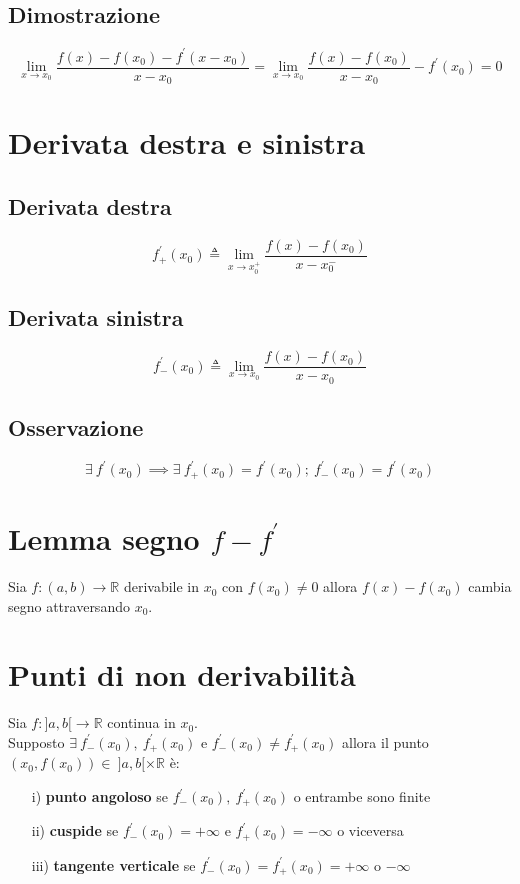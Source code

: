 \subsection{Dimostrazione}
\begin{equation}
\displaystyle \lim_{x \to x_0} \frac{f(x) - f(x_0) - f^{\prime}(x - x_0)}{x - x_0} = \lim_{x \to x_0} \frac{f(x) - f(x_0)}{x - x_0} - f^{\prime}(x_0) = 0
\end{equation}

\section{Derivata destra e sinistra}
\subsection{Derivata destra}
\begin{equation}
f^{\prime}_+(x_0) \triangleq \displaystyle \lim_{x \to x_0^+} \frac{f(x) - f(x_0)}{x - x_0^-}
\end{equation}
\subsection{Derivata sinistra}
\begin{equation}
f^{\prime}_-(x_0) \triangleq \displaystyle \lim_{x \to x_0} \frac{f(x) - f(x_0)}{x - x_0}
\end{equation}
\subsection{Osservazione}
\begin{equation}
\exists\ f^{\prime}(x_0) \implies \exists\ f^{\prime}_+(x_0) = f^{\prime}(x_0);\ f^{\prime}_-(x_0) = f^{\prime}(x_0)
\end{equation}

\section{Lemma segno $f - f^{\prime}$}
Sia $f: (a,b)  \to \mathbb{R}$ derivabile in $x_0$ con $f(x_0) \neq 0$ allora $f(x) - f(x_0)$ cambia segno attraversando $x_0$.

\section{Punti di non derivabilità}
Sia $f: ]a,b[  \to \mathbb{R}$ continua in $x_0$.\\
Supposto $\exists\ f^{\prime}_-(x_0),\ f^{\prime}_+(x_0)$ e $f^{\prime}_-(x_0) \neq f^{\prime}_+(x_0)$ allora il punto $(x_0, f(x_0)) \in \ ]a,b[ \times \mathbb{R}$ è:
\begin{enumerate}
\item[i)] \textbf{punto angoloso} se $f^{\prime}_-(x_0),\ f^{\prime}_+(x_0)$ o entrambe sono finite
\item[ii)] \textbf{cuspide} se $f^{\prime}_-(x_0) = +\infty$ e $f^{\prime}_+(x_0) = -\infty$ o viceversa
\item[iii)] \textbf{tangente verticale} se $f^{\prime}_-(x_0) = f^{\prime}_+(x_0) = +\infty$ o $-\infty$
\end{enumerate}
